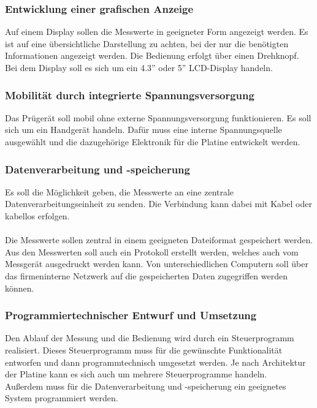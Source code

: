 \subsubsection{Entwicklung einer grafischen Anzeige}
Auf einem Display sollen die Messwerte in geeigneter Form angezeigt werden.
Es ist auf eine übersichtliche Darstellung zu achten, bei der nur die benötigten
Informationen angezeigt werden. Die Bedienung erfolgt über einen Drehknopf.
\\
Bei dem Display soll es sich um ein 4.3'' oder 5'' LCD-Display handeln.

\subsubsection{Mobilität durch integrierte Spannungsversorgung}
Das Prügerät soll mobil ohne externe Spannungsversorgung funktionieren.
Es soll sich um ein Handgerät handeln. Dafür muss eine interne Spannungsquelle ausgewählt
und die dazugehörige Elektronik für die Platine entwickelt werden.

\subsubsection{Datenverarbeitung und -speicherung}
Es soll die Möglichkeit geben, die Messwerte an eine zentrale Datenverarbeitungseinheit zu senden.
Die Verbindung kann dabei mit Kabel oder kabellos erfolgen.
\\
\\
Die Messwerte sollen zentral in einem geeigneten Dateiformat gespeichert werden.
Aus den Messwerten soll auch ein Protokoll erstellt werden, welches auch vom Messgerät
ausgedruckt werden kann. Von unterschiedlichen Computern soll über das firmeninterne Netzwerk
auf die gespeicherten Daten zugegriffen werden können.

\subsubsection{Programmiertechnischer Entwurf und Umsetzung}
Den Ablauf der Messung und die Bedienung wird durch ein Steuerprogramm realisiert.
Dieses Steuerprogramm muss für die gewünschte Funktionalität entworfen und dann
programmtechnisch umgesetzt werden. Je nach Architektur der Platine kann es sich auch
um mehrere Steuerprogramme handeln.
\\
Außerdem muss für die Datenverarbeitung und -speicherung ein geeignetes System programmiert werden.

